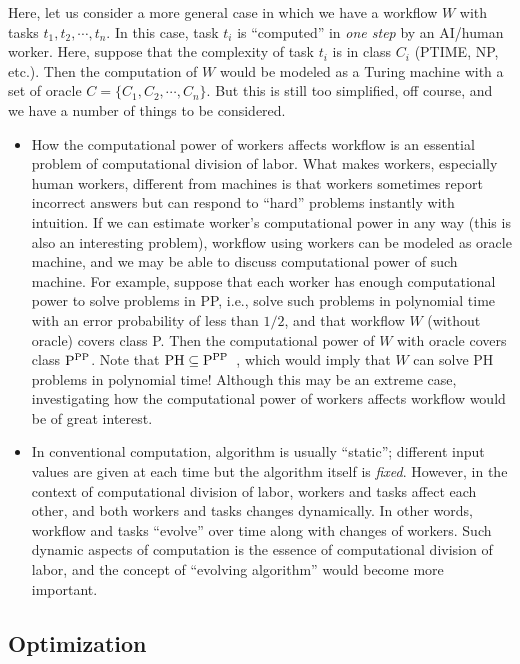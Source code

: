 Here, let us consider a more general case in which we have a workflow
$W$ with tasks $t_1,t_2,\cdots,t_n$. In this case, task $t_i$ is
``computed'' in {\em one step\/} by an AI/human worker. Here, suppose
that the complexity of task $t_i$ is in class $C_i$ (PTIME, NP,
etc.). Then the computation of $W$ would be modeled as a Turing
machine with a set of oracle $C = \{C_1,C_2,\cdots,C_n\}$. But this is
still too simplified, off course, and we have a number of things to be
considered.
\begin{itemize}
\item How the computational power of workers affects workflow is an
  essential problem of computational division of labor. What makes
  workers, especially human workers, different from machines is that
  workers sometimes report incorrect answers but can respond to
  ``hard'' problems instantly with intuition. If we can estimate
  worker's computational power in any way (this is also an interesting
  problem), workflow using workers can be modeled as oracle machine,
  and we may be able to discuss computational power of such
  machine. For example, suppose that each worker has enough
  computational power to solve problems in PP, i.e., solve such
  problems in polynomial time with an error probability of less than
  $1/2$, and that workflow $W$ (without oracle) covers class P. Then
  the computational power of $W$ with oracle covers class
  ${\rm P}^{\rm PP}$. Note that
  ${\rm PH} \subseteq {\rm P}^{\rm PP}$~\cite{Tod91}, which would
  imply that $W$ can solve PH problems in polynomial time! Although
  this may be an extreme case, investigating how the computational
  power of workers affects workflow would be of great interest.
   
\item In conventional computation, algorithm is usually ``static'';
  different input values are given at each time but the algorithm
  itself is {\em fixed}. However, in the context of computational
  division of labor, workers and tasks affect each other, and both
  workers and tasks changes dynamically. In other words, workflow and
  tasks ``evolve'' over time along with changes of workers. Such
  dynamic aspects of computation is the essence of computational
  division of labor, and the concept of ``evolving algorithm'' would
  become more important.
\end{itemize}

\subsection{Optimization}

